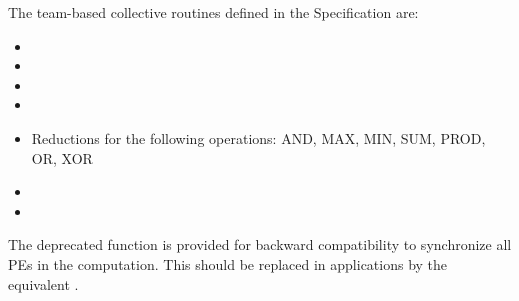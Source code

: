 {The team-based collective routines defined in the \openshmem Specification are:

\begin{itemize}
\item {}
\item {}
\item {}
\item {}
\item Reductions for the following operations: AND, MAX, MIN, SUM, PROD, OR, XOR
\item {}
\item {}
\end{itemize}

The deprecated function  is provided for backward compatibility to synchronize
all \acp{PE} in the computation. This should be replaced in applications by the equivalent
.
}

